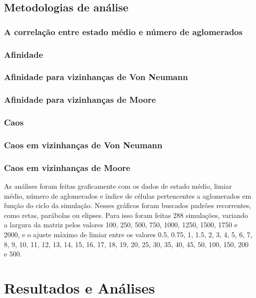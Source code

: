 \documentclass[
	12pt,				%
	openright,			%
	twoside,			%
	a4paper,			%
	english,			%
	french,				%
	spanish,			%
	brazil				%
	]{abntex2}
\begin{document}
\section*{Metodologias de análise}

\subsection*{A correlação entre estado médio e número de aglomerados}

\subsection*{Afinidade}

\subsection*{Afinidade para vizinhanças de Von Neumann}

\subsection*{Afinidade para vizinhanças de Moore}

\subsection*{Caos}

\subsection*{Caos em vizinhanças de Von Neumann}

\subsection*{Caos em vizinhanças de Moore}

As análises foram feitas graficamente com os dados de estado médio, limiar médio, número de aglomerados e índice de células pertencentes a aglomerados em função do ciclo da simulação. Nesses gráficos foram buscados padrões recorrentes, como retas, parábolas ou elipses. Para isso foram feitas 288 simulações, variando a largura da matriz pelos valores 100, 250,
500,
750,
1000,
1250,
1500,
1750 e
2000, e o ajuste máximo de limiar entre os valores 0.5,
0.75,
1,
1.5,
2,
3,
4,
5,
6,
7,
8,
9,
10,
11,
12,
13,
14,
15,
16,
17,
18,
19,
20,
25,
30,
35,
40,
45,
50,
100,
150,
200 e
500.

\chapter{Resultados e Análises}
\end{document}

